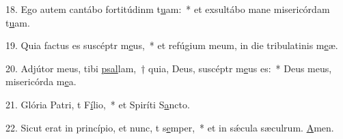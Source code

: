 18. Ego autem cantábo fortitúdinm t\uline{u}am:~* et exsultábo mane misericórdam t\uline{u}am.\par 
19. Quia factus es suscéptr m\uline{e}us,~* et refúgium meum, in die tribulatinis m\uline{e}æ.\par 
20. Adjútor meus, tibi \uline{psal}lam,~† quia, Deus, suscéptr m\uline{e}us es:~* Deus meus, misericórda m\uline{e}a.\par 
21. Glória Patri, t F\uline{í}lio,~* et Spiríti S\uline{a}ncto.\par 
22. Sicut erat in princípio, et nunc, t s\uline{e}mper,~* et in sǽcula sæculrum. \uline{A}men.\par 
